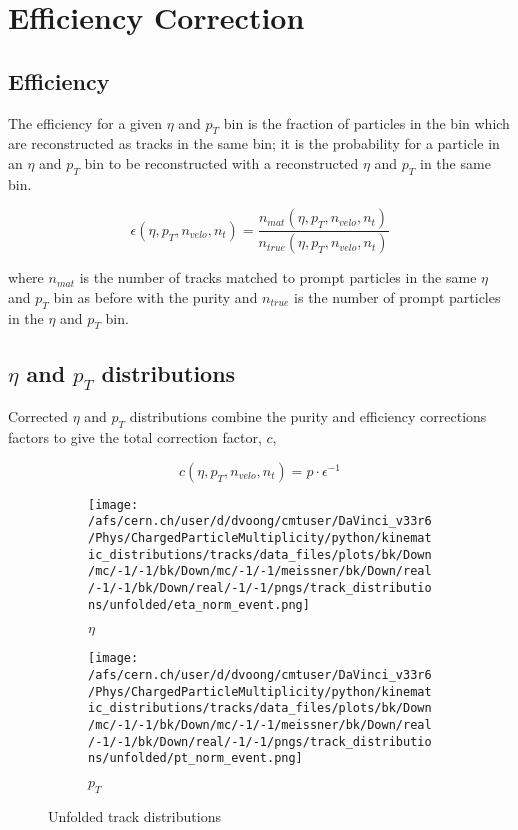 \section{Efficiency Correction}

\subsection*{Efficiency}

The efficiency for a given $\eta$ and $p_T$ bin is the fraction of particles in the bin which are reconstructed as tracks in the same bin; it is the probability for a particle in an $\eta$ and $p_T$ bin to be reconstructed with a reconstructed $\eta$ and $p_T$ in the same bin.

\begin{equation}
	\epsilon(\eta, p_T, n_{velo}, n_t) = \frac{n_{mat}(\eta, p_T, n_{velo}, n_t)}{n_{true}(\eta, p_T, n_{velo}, n_t)}
\end{equation}

where $n_{mat}$ is the number of tracks matched to prompt particles in the same $\eta$ and $p_T$ bin as before with the purity and $n_{true}$ is the number of prompt particles in the $\eta$ and $p_T$ bin.

\subsection*{$\eta$ and $p_T$ distributions}

Corrected $\eta$ and $p_T$ distributions combine the purity and efficiency corrections factors to give the total correction factor, $c$,

\begin{equation}
	c(\eta, p_T, n_{velo}, n_t) = p \cdot \epsilon^{-1}
\end{equation}

\begin{figure}[h]
	\begin{subfigure}[h]{0.49\textwidth}
		\texttt{[image: /afs/cern.ch/user/d/dvoong/cmtuser/DaVinci\_v33r6/Phys/ChargedParticleMultiplicity/python/kinematic\_distributions/tracks/data\_files/plots/bk/Down/mc/-1/-1/bk/Down/mc/-1/-1/meissner/bk/Down/real/-1/-1/bk/Down/real/-1/-1/pngs/track\_distributions/unfolded/eta\_norm\_event.png]}
		\caption{$\eta$}
		\label{fig: background corrected track distributions eta}
	\end{subfigure}
	\begin{subfigure}[h]{0.49\textwidth}
		\texttt{[image: /afs/cern.ch/user/d/dvoong/cmtuser/DaVinci\_v33r6/Phys/ChargedParticleMultiplicity/python/kinematic\_distributions/tracks/data\_files/plots/bk/Down/mc/-1/-1/bk/Down/mc/-1/-1/meissner/bk/Down/real/-1/-1/bk/Down/real/-1/-1/pngs/track\_distributions/unfolded/pt\_norm\_event.png]}
		\caption{$p_T$}
		\label{fig: background corrected track distributions pt}
	\end{subfigure}
	\caption{Unfolded track distributions}
	\label{fig: unfolded track distributions}
\end{figure}

